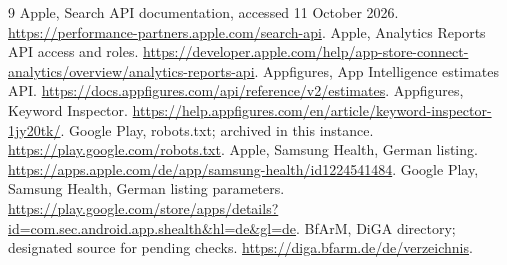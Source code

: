 \documentclass[10pt,a4paper]{article}
\begin{document}
\begin{thebibliography}{9}
 Apple, Search API documentation, accessed 11 October 2026.
\url{https://performance-partners.apple.com/search-api}.
 Apple, Analytics Reports API access and roles.
\url{https://developer.apple.com/help/app-store-connect-analytics/overview/analytics-reports-api}.
 Appfigures, App Intelligence estimates API.
\url{https://docs.appfigures.com/api/reference/v2/estimates}.
 Appfigures, Keyword Inspector.
\url{https://help.appfigures.com/en/article/keyword-inspector-1jy20tk/}.
 Google Play, robots.txt; archived in this instance.
\url{https://play.google.com/robots.txt}.
 Apple, Samsung Health, German listing.
\url{https://apps.apple.com/de/app/samsung-health/id1224541484}.
 Google Play, Samsung Health, German listing parameters.
\url{https://play.google.com/store/apps/details?id=com.sec.android.app.shealth&hl=de&gl=de}.
 BfArM, DiGA directory; designated source for pending checks.
\url{https://diga.bfarm.de/de/verzeichnis}.
\end{thebibliography}

\clearpage\appendix
\end{document}
